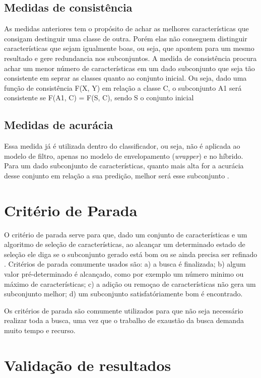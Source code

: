 \subsection{Medidas de consistência}

As medidas anteriores tem o propósito de achar as melhores características que consigam destinguir uma classe de outra. Porém elas não conseguem distinguir características que sejam igualmente boas, ou seja, que apontem para um mesmo resultado e gere redundancia nos subconjuntos. A medida de consistência procura achar um menor número de características em um dado subconjunto que seja tão consistente em seprar as classes quanto ao conjunto inicial. Ou seja, dado uma função de consistência F(X, Y) em relação a classe C, o subconjunto A1 será consistente se F(A1, C) = F(S, C), sendo S o conjunto inicial \cite{liu_2005}

\subsection{Medidas de acurácia}

Essa medida já é utilizada dentro do classificador, ou seja, não é aplicada ao modelo de filtro, apenas no modelo de envelopamento (\textit{wrapper}) e no híbrido. Para um dado subconjunto de características, quanto mais alta for a acurácia desse conjunto em relação a sua predição, melhor será esse subconjunto \cite{huan_1998}.

\section{Critério de Parada}

O critério de parada serve para que, dado um conjunto de características e um algoritmo de seleção de características, ao alcançar um determinado estado de seleção ele diga se o subconjunto gerado está bom ou se ainda precisa ser refinado \cite{dash_1997}. Critérios de parada comumente usados são: a) a busca é finalizada; b) algum valor pré-determinado é alcançado, como por exemplo um número minimo ou máximo de características; c) a adição ou remoçao de características não gera um subconjunto melhor; d) um subconjunto satisfatóriamente bom é encontrado.

Os critérios de parada são comumente utilizados para que não seja necessário realizar toda a busca, uma vez que o trabalho de exaustão da busca demanda muito tempo e recurso.

\section{Validação de resultados}

